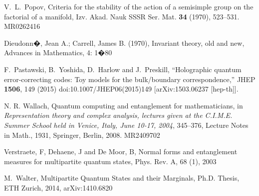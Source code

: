 \documentclass[12pt]{article}
\theoremstyle{definition}
\begin{document}
\begin{thebibliography}{AAAA}
V.~L.~Popov, Criteria for the stability of the action of a semisimple
group on the factorial of a manifold, Izv. Akad. Nauk SSSR Ser.
Mat. {\bf 34} (1970), 523--531. MR0262416

Dieudonn�, Jean A.; Carrell, James B. (1970), Invariant theory, old and new, Advances in Mathematics, 4: 1�80


  F.~Pastawski, B.~Yoshida, D.~Harlow and J.~Preskill,
  ``Holographic quantum error-correcting codes: Toy models for the bulk/boundary correspondence,''
  JHEP {\bf 1506}, 149 (2015)
  doi:10.1007/JHEP06(2015)149
  [arXiv:1503.06237 [hep-th]].

N. R. Wallach, Quantum computing and entanglement for mathematicians, in
{\it Representation theory and complex analysis, lectures given
at the C.I.M.E.  Summer School held in Venice, Italy, June 10-17, 2004},
345--376, Lecture Notes in Math., 1931, Springer, Berlin, 2008. MR2409702

Verstraete, F, Dehaene, J and De Moor, B,  Normal forms and entanglement measures for multipartite quantum states, Phys. Rev. A, 68 (1), 2003

M.~Walter, Multipartite Quantum States and their Marginals, Ph.D.
Thesis, ETH Zurich, 2014, arXiv:1410.6820

\end{thebibliography}
\end{document}
